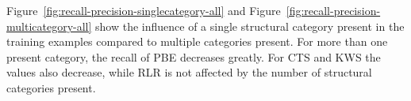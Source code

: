 \documentclass[\myrootdir/main.tex]{subfiles}
\begin{document}
Figure~\ref{fig:recall-precision-singlecategory-all} and Figure~\ref{fig:recall-precision-multicategory-all} show the influence of a single structural category present in the training examples compared to multiple categories present.
For more than one present category, the recall of PBE decreases greatly.
For CTS and KWS the values also decrease, while RLR is not affected by the number of structural categories present.
\end{document}
